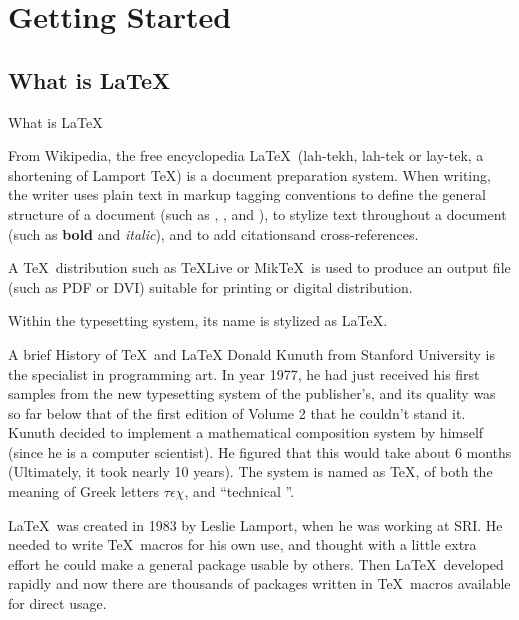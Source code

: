 
\section{Getting Started}

\subsection{What is \LaTeX}

\begin{frame}{What is \LaTeX}
	\begin{block}{From Wikipedia, the free encyclopedia\footnotemark[1]}
		\LaTeX\ (lah-tekh, lah-tek or lay-tek, a shortening of Lamport \TeX) is a document preparation system. When writing, the writer uses plain text in markup tagging conventions to define the general structure of a document (such as , , and ), to stylize text throughout a document (such as \textbf{bold} and \textit{italic}), and to add citations\footnotemark[1] and cross-references. \medskip
		
		A \TeX\ distribution such as \TeX Live or Mik\TeX\ is used to produce an output file (such as PDF or DVI) suitable for printing or digital distribution. \medskip
		
		Within the typesetting system, its name is stylized as \LaTeX.	
	\end{block}
	

\end{frame}

\begin{frame}{A brief History of \TeX\ and \LaTeX}
	Donald Kunuth from Stanford University is the specialist in programming art. In year 1977, he had just received his first samples from the new typesetting system of the publisher's, and its quality was so far below that of the first edition of Volume 2 that he couldn't stand it. Kunuth decided to implement a mathematical composition system by himself (since he is a computer scientist). He figured that this would take about 6 months (Ultimately, it took nearly 10 years). The system is named as \TeX, of both the meaning of Greek letters $\tau\epsilon\chi$, and ``technical ''. \medskip
	
	\LaTeX\ was created in 1983 by Leslie Lamport, when he was working at SRI. He needed to write \TeX\ macros for his own use, and thought with a little extra effort he could make a general package usable by others. Then \LaTeX\  developed rapidly and now there are thousands of packages written in \TeX\ macros available for direct usage.
	
\end{frame}

